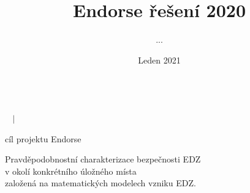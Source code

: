 \documentclass[10pt,xcolor={usenames,dvipsnames}]{beamer} %
\title[parametry EDZ]{Endorse řešení 2020}
\author{...}
\institute{Technical University of Liberec}
\date{Leden 2021}
\begin{document}


{  
   
    
    \begin{frame}
        \centering
        \vspace{0.5cm}
        {\bf\large\inserttitle}\\
        \vspace{2mm}
        \textit{\insertauthor~ \textcolor{structure}{$\boldsymbol{|}$} \insertdate}
    \end{frame}
}



\begin{frame}{cíl projektu Endorse}
 
 Pravděpodobnostní charakterizace bezpečnosti EDZ\\
 v okolí konkrétního úložného místa\\
 založená na matematických modelech vzniku EDZ.
 
\end{frame}
\end{document}
